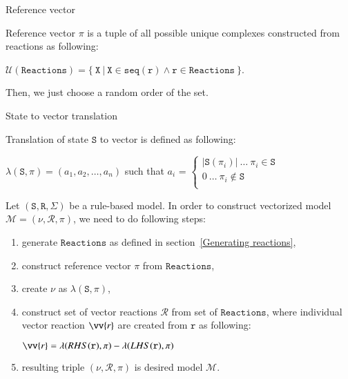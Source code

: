 \documentclass{elsarticle}
\begin{document}
\begin{definition}{Reference vector}

Reference vector $\pi$ is a tuple of all possible unique complexes constructed from reactions as following:

\begin{center}
$\mathcal{U}(\mathtt{Reactions}) = \{~ \mathtt{X} ~|~ \mathtt{X} \in \mathtt{seq}(\mathtt{r}) \wedge \mathtt{r} \in \mathtt{Reactions} ~\} $.
\end{center}

Then, we just choose a random order of the set.
\end{definition}

\begin{definition}{State to vector translation}

Translation of state $\mathtt{S}$ to vector is defined as following:
\begin{center}
$\lambda(\mathtt{S}, \pi) = (a_1, a_2, \ldots, a_n)$ such that 
$a_i$ =
	$\begin{cases}
	|\mathtt{S}(\pi_i)| ~\ldots~ \pi_i \in \mathtt{S}\\
	0 ~\ldots~ \pi_i \not\in \mathtt{S}\\
	\end{cases}
	$
\end{center}
\end{definition}

Let $(\mathtt{S}, \mathtt{R}, \Sigma)$ be a rule-based model. In order to construct vectorized model $\mathcal{M} = (\nu, \mathcal{R}, \pi)$, we need to do following steps:

\begin{enumerate}
\item generate $\mathtt{Reactions}$ as defined in section~\ref{Generating reactions},
\item construct reference vector $\pi$ from $\mathtt{Reactions}$,
\item create $\nu$ as $\lambda(\mathtt{S}, \pi)$,
\item construct set of vector reactions $\mathcal{R}$ from set of $\mathtt{Reactions}$, where individual vector reaction $\vv{r}$ are created from $\mathtt{r}$ as following:

\begin{center}
$\vv{r} = \lambda(RHS(\mathtt{r}), \pi) - \lambda(LHS(\mathtt{r}), \pi)$
\end{center}

\item resulting triple $(\nu, \mathcal{R}, \pi)$ is desired model $\mathcal{M}$.
\end{enumerate}
\end{document}
